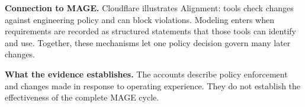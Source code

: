 \textbf{Connection to MAGE.} Cloudflare illustrates Alignment: tools check changes against engineering policy and can block violations. Modeling enters when requirements are recorded as structured statements that those tools can identify and use. Together, these mechanisms let one policy decision govern many later changes.

\textbf{What the evidence establishes.} The accounts describe policy enforcement and changes made in response to operating experience. They do not establish the effectiveness of the complete MAGE cycle.
